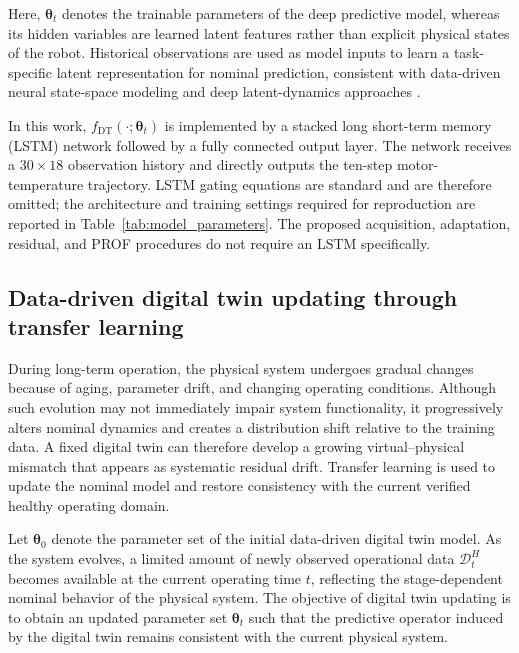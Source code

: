 \documentclass[a4paper,10pt]{cas-sc}%
\newcommand{\roundtworev}[1]{\textcolor{roundtwored}{#1}}
\newenvironment{revision}{}{}
\begin{document}
\roundtworev{Here, $\boldsymbol{\theta}_t$ denotes the trainable parameters of the deep predictive model, whereas its hidden variables are learned latent features rather than explicit physical states of the robot. Historical observations are used as model inputs to learn a task-specific latent representation for nominal prediction, consistent with data-driven neural state-space modeling and deep latent-dynamics approaches \citep{revach2022kalmanet,lusch2018deep}.}

\begin{revision}
	In this work, $f_{\mathrm{DT}}(\cdot;\boldsymbol{\theta}_t)$ is implemented by a stacked long short-term memory (LSTM) network followed by a fully connected output layer. The network receives a $30\times18$ observation history and directly outputs the ten-step motor-temperature trajectory. LSTM gating equations are standard and are therefore omitted; the architecture and training settings required for reproduction are reported in Table~\ref{tab:model_parameters}. The proposed acquisition, adaptation, residual, and PROF procedures do not require an LSTM specifically.
\end{revision}

\subsection{Data-driven digital twin updating through transfer learning}\label{sec:3.3}

During long-term operation, the physical system undergoes gradual changes because of aging, parameter drift, and changing operating conditions. Although such evolution may not immediately impair system functionality, it progressively alters nominal dynamics and creates a distribution shift relative to the training data. A fixed digital twin can therefore develop a growing virtual--physical mismatch that appears as systematic residual drift. Transfer learning is used to update the nominal model and restore consistency with the current verified healthy operating domain.

Let $\boldsymbol{\theta}_0$ denote the parameter set of the initial data-driven digital twin model. As the system evolves, a limited amount of newly observed operational data $\mathcal{D}_t^{H}$ becomes available at the current operating time $t$, reflecting the stage-dependent nominal behavior of the physical system. The objective of digital twin updating is to obtain an updated parameter set $\boldsymbol{\theta}_t$ such that the predictive operator induced by the digital twin remains consistent with the current physical system.
\end{document}
